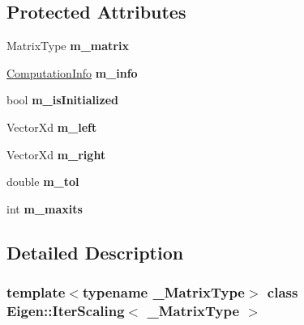 \subsection*{Protected Attributes}
\begin{DoxyCompactItemize}
\item 
\mbox{\label{class_eigen_1_1_iter_scaling_a74612506f9ae1b1a581fc39f967c3c42}} 
Matrix\+Type {\bfseries m\+\_\+matrix}
\item 
\mbox{\label{class_eigen_1_1_iter_scaling_a05266c9db0cafc39baca3be720e2f5dc}} 
\hyperlink{group__enums_ga85fad7b87587764e5cf6b513a9e0ee5e}{Computation\+Info} {\bfseries m\+\_\+info}
\item 
\mbox{\label{class_eigen_1_1_iter_scaling_ad7d118078e4fb20883c7f4f888085341}} 
bool {\bfseries m\+\_\+is\+Initialized}
\item 
\mbox{\label{class_eigen_1_1_iter_scaling_a0667ac97fbc4c1fee289bcc1364a3c9f}} 
Vector\+Xd {\bfseries m\+\_\+left}
\item 
\mbox{\label{class_eigen_1_1_iter_scaling_ad8f8bee1e273144087d3fca8490171b3}} 
Vector\+Xd {\bfseries m\+\_\+right}
\item 
\mbox{\label{class_eigen_1_1_iter_scaling_a1110e507bd894bead8e521166bacb914}} 
double {\bfseries m\+\_\+tol}
\item 
\mbox{\label{class_eigen_1_1_iter_scaling_a05e2994928c48453f8c9881524b71a34}} 
int {\bfseries m\+\_\+maxits}
\end{DoxyCompactItemize}


\subsection{Detailed Description}
\subsubsection*{template$<$typename \+\_\+\+Matrix\+Type$>$\newline
class Eigen\+::\+Iter\+Scaling$<$ \+\_\+\+Matrix\+Type $>$}

